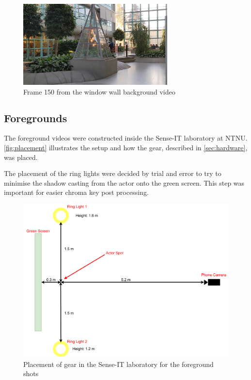 \begin{figure}[H]
    \centering
    \includegraphics[width=0.7\textwidth]{img/video_frame_150/BG_Window_150.jpg}
    \caption{Frame 150 from the window wall background video}
    \label{fig:background_window_wall}
\end{figure}

\subsection{Foregrounds}\label{sec:foregrounds}
The foreground videos were constructed inside the Sense-IT laboratory at NTNU. \autoref{fig:placement} illustrates the setup and how the gear, described in \autoref{sec:hardware}, was placed. 

The placement of the ring lights were decided by trial and error to try to minimise the shadow casting from the actor onto the green screen. This step was important for easier chroma key post processing.

\begin{figure}[H]
  \centering
  \includegraphics[width=\textwidth]{img/video_setup/placement.pdf}
  \caption{Placement of gear in the Sense-IT laboratory for the foreground shots}
  \label{fig:placement}
\end{figure}

